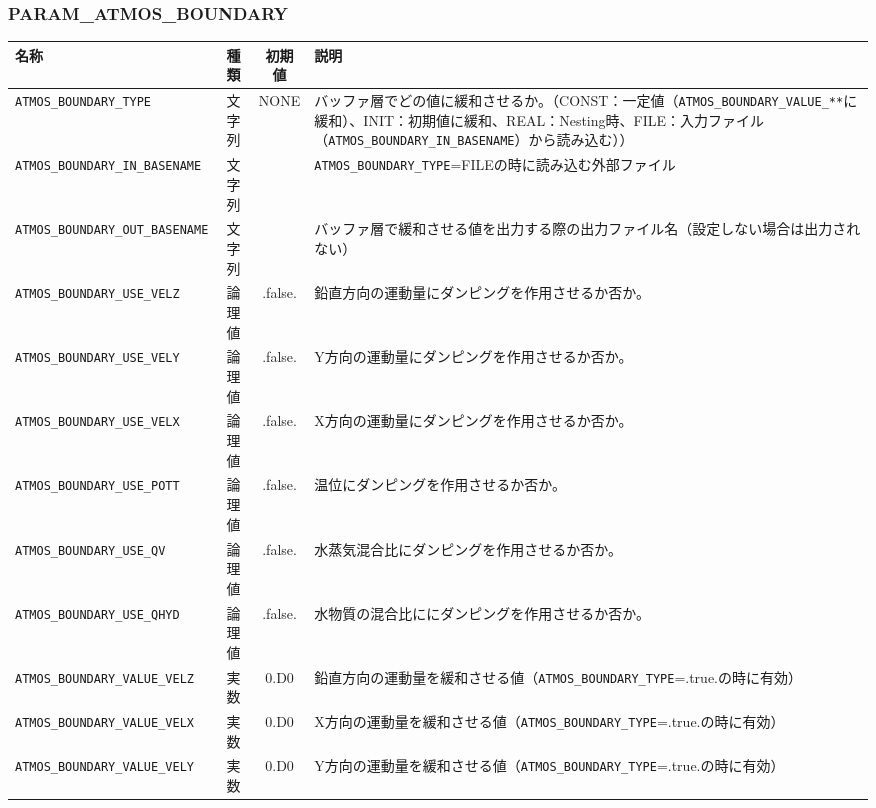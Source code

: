 \subsubsection{PARAM\_ATMOS\_BOUNDARY}
\begin{tabularx}{150mm}{|l|c|c|X|} \hline
 \rowcolor[gray]{0.9} 名称 & 種類 & 初期値 & 説明 \\ \hline
 \verb|ATMOS_BOUNDARY_TYPE| & 文字列 & NONE & バッファ層でどの値に緩和させるか。（CONST：一定値（\verb|ATMOS_BOUNDARY_VALUE_**|に緩和）、INIT：初期値に緩和、REAL：Nesting時、FILE：入力ファイル（\verb|ATMOS_BOUNDARY_IN_BASENAME|）から読み込む）） \\ \hline
 \verb|ATMOS_BOUNDARY_IN_BASENAME| & 文字列 &  & \verb|ATMOS_BOUNDARY_TYPE|=FILEの時に読み込む外部ファイル  \\ \hline
 \verb|ATMOS_BOUNDARY_OUT_BASENAME| & 文字列 &  & バッファ層で緩和させる値を出力する際の出力ファイル名（設定しない場合は出力されない） \\ \hline
 \verb|ATMOS_BOUNDARY_USE_VELZ| & 論理値 & .false. &  鉛直方向の運動量にダンピングを作用させるか否か。 \\ \hline
 \verb|ATMOS_BOUNDARY_USE_VELY| & 論理値 & .false. &  Y方向の運動量にダンピングを作用させるか否か。 \\ \hline
 \verb|ATMOS_BOUNDARY_USE_VELX| & 論理値 & .false. &  X方向の運動量にダンピングを作用させるか否か。 \\ \hline
 \verb|ATMOS_BOUNDARY_USE_POTT| & 論理値 & .false. &  温位にダンピングを作用させるか否か。 \\ \hline
 \verb|ATMOS_BOUNDARY_USE_QV| & 論理値 & .false. &  水蒸気混合比にダンピングを作用させるか否か。 \\ \hline
 \verb|ATMOS_BOUNDARY_USE_QHYD| & 論理値 & .false. &  水物質の混合比ににダンピングを作用させるか否か。 \\ \hline
 \verb|ATMOS_BOUNDARY_VALUE_VELZ| & 実数 & 0.D0 & 鉛直方向の運動量を緩和させる値（\verb|ATMOS_BOUNDARY_TYPE|=.true.の時に有効） \\ \hline
 \verb|ATMOS_BOUNDARY_VALUE_VELX| & 実数 & 0.D0 & X方向の運動量を緩和させる値（\verb|ATMOS_BOUNDARY_TYPE|=.true.の時に有効） \\ \hline
 \verb|ATMOS_BOUNDARY_VALUE_VELY| & 実数 & 0.D0 & Y方向の運動量を緩和させる値（\verb|ATMOS_BOUNDARY_TYPE|=.true.の時に有効） \\ \hline

\end{tabularx}
